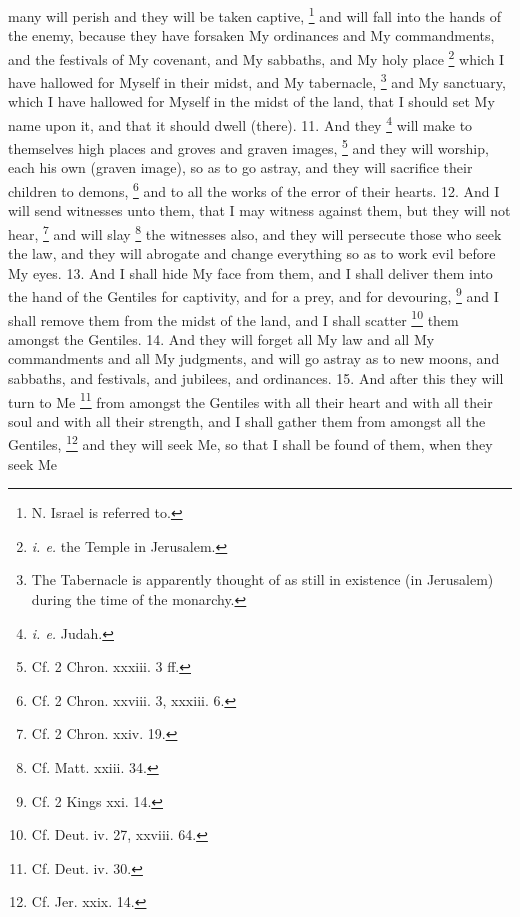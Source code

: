 many will perish and they will be taken captive, \footnote{N. Israel is referred to.} and will fall into the hands of the enemy, because they have forsaken My ordinances and My commandments, and the festivals of My covenant, and My sabbaths, and My holy place \footnote{\emph{i. e.} the Temple in Jerusalem.} which I have hallowed for Myself in their midst, and My tabernacle, \footnote{The Tabernacle is apparently thought of as still in existence (in Jerusalem) during the time of the monarchy.} and My sanctuary, which I have hallowed for Myself in the midst of the land, that I should set My name upon it, and that it should dwell (there). 11. And they \footnote{\emph{i. e.} Judah.} will make to themselves high places and groves and graven images, \footnote{Cf. 2 Chron. xxxiii. 3 ff.} and they will worship, each his own (graven image), so as to go astray, and they will sacrifice their children to demons, \footnote{Cf. 2 Chron. xxviii. 3, xxxiii. 6.} and to all the works of the error of their hearts. 12. And I will send witnesses unto them, that I may witness against them, but they will not hear, \footnote{Cf. 2 Chron. xxiv. 19.} and will slay \footnote{Cf. Matt. xxiii. 34.} the witnesses also, and they will persecute those who seek the law, and they will abrogate and change everything so as to work evil before My eyes. 13. And I shall hide My face from them, and I shall deliver them into the hand of the Gentiles for captivity, and for a prey, and for devouring, \footnote{Cf. 2 Kings xxi. 14.} and I shall remove them from the midst of the land, and I shall scatter \footnote{Cf. Deut. iv. 27, xxviii. 64.} them amongst the Gentiles. 14. And they will forget all My law and all My commandments and all My judgments, and will go astray as to new moons, and sabbaths, and festivals, and jubilees, and ordinances. 15. And after this they will turn to Me \footnote{Cf. Deut. iv. 30.} from amongst the Gentiles with all their heart and with all their soul and with all their strength, and I shall gather them from amongst all the Gentiles, \footnote{Cf. Jer. xxix. 14.} and they will seek Me, so that I shall be found of them, when they seek Me

